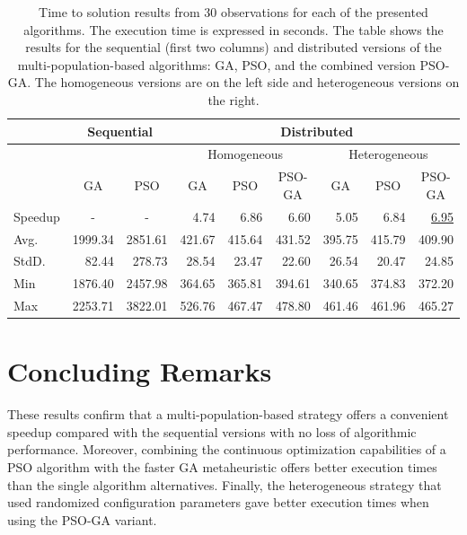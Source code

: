 \documentclass[runningheads]{llncs}
\begin{document}
\begin{table}[]
\caption{
  Time to solution results %
  from 30 observations for each of the
    presented algorithms. The execution time is expressed in seconds. The table
    shows the results for the sequential (first two columns) and distributed
    versions of the multi-population-based algorithms: GA, PSO, and the combined
    version PSO-GA. The homogeneous versions are on the left side and
    heterogeneous versions on the right.
    }\label{tab:speedup}
\renewcommand*{\arraystretch}{1.4}
\setlength{\tabcolsep}{5pt}
    \begin{small}
\begin{tabular}{lrrrrrrrr}
    \hline
				&  \multicolumn{2}{c}{Sequential} & \multicolumn{6}{c}{Distributed} \\
    \hline
    & &    & \multicolumn{3}{c}{Homogeneous} & \multicolumn{3}{c}{Heterogeneous} \\
    \cline{4-6} \cline{7-9}
       & \multicolumn{1}{c}{GA} & \multicolumn{1}{c}{PSO} &\multicolumn{1}{c}{GA} & \multicolumn{1}{c}{PSO} & \multicolumn{1}{c}{PSO-GA} &\multicolumn{1}{c}{GA} & \multicolumn{1}{c}{PSO} & \multicolumn{1}{c}{PSO-GA}\\
    \hline
    Speedup & \multicolumn{1}{c}{-} & \multicolumn{1}{c}{-} & 4.74 & 6.86 & 6.60 & 5.05 & 6.84 & \underline{6.95} \\
    \hline
Avg.   & 1999.34 & 2851.61 & 421.67 & 415.64 & 431.52 & 395.75 & 415.79 & 409.90 \\
    \hline
StdD.   & 82.44   & 278.73  & 28.54           & 23.47                    & 22.60           & 26.54           & 20.47           & 24.85    \\
    \hline
Min    & 1876.40 & 2457.98 & 364.65          & 365.81                   & 394.61          & 340.65          & 374.83          & 372.20   \\
    \hline
Max    & 2253.71 & 3822.01 & 526.76          & 467.47                   & 478.80          & 461.46          & 461.96          & 465.27  \\
    \hline
\end{tabular}
    \end{small}
\end{table}

\section{Concluding Remarks}

These results confirm that a multi-population-based strategy offers a convenient
speedup compared with the sequential versions %
with no loss of algorithmic performance. %
Moreover, combining the continuous optimization capabilities of a PSO algorithm with the
faster GA metaheuristic offers better execution times than the single algorithm alternatives.
Finally, the heterogeneous strategy that used
randomized configuration parameters gave better execution times when using the
PSO-GA variant.
\end{document}
